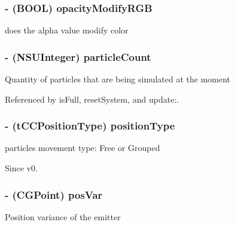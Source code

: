 \hypertarget{interface_c_c_particle_system_adbacc119b077190034693f4cadf270b6}{
\subsubsection[{opacity\-Modify\-R\-G\-B}]{\setlength{\rightskip}{0pt plus 5cm}-\/ (B\-O\-O\-L) {\bf opacity\-Modify\-R\-G\-B}}}\label{interface_c_c_particle_system_adbacc119b077190034693f4cadf270b6}
does the alpha value modify color \hypertarget{interface_c_c_particle_system_a129f846f7ff4207cf6dd9e95f97a780f}{
\subsubsection[{particle\-Count}]{\setlength{\rightskip}{0pt plus 5cm}-\/ (N\-S\-U\-Integer) {\bf particle\-Count}}}\label{interface_c_c_particle_system_a129f846f7ff4207cf6dd9e95f97a780f}
Quantity of particles that are being simulated at the moment 

Referenced by is\-Full, reset\-System, and update\-:.

\hypertarget{interface_c_c_particle_system_afe4cea3adf77adad04de3a511da2e996}{
\subsubsection[{position\-Type}]{\setlength{\rightskip}{0pt plus 5cm}-\/ (t\-C\-C\-Position\-Type) {\bf position\-Type}}}\label{interface_c_c_particle_system_afe4cea3adf77adad04de3a511da2e996}
particles movement type\-: Free or Grouped \begin{DoxySince}{Since}
v0. 
\end{DoxySince}
\hypertarget{interface_c_c_particle_system_a83bd3365f1a7e6e793e526e3f1619027}{
\subsubsection[{pos\-Var}]{\setlength{\rightskip}{0pt plus 5cm}-\/ (C\-G\-Point) {\bf pos\-Var}}}\label{interface_c_c_particle_system_a83bd3365f1a7e6e793e526e3f1619027}
Position variance of the emitter 


